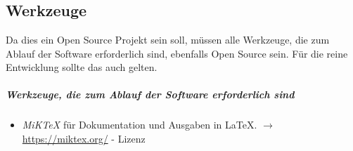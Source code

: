 \documentclass[english,ngerman,parskip=half,headsepline,footsepline]{scrreprt}
\newcounter{Enumi}
\begin{document}
	\appendix
	\chapter{\appendixname} %

	\thispagestyle{scrheadings}

	\section{Werkzeuge} %
	\label{sec:Werkzeuge}

	Da dies ein Open Source Projekt sein soll, müssen alle Werkzeuge, die zum Ablauf der Software erforderlich sind, ebenfalls Open Source sein. Für die reine Entwicklung sollte das auch gelten.

	\paragraph{Werkzeuge, die zum Ablauf der Software erforderlich sind}
	\begin{itemize}

		\item\label{Werkzeug:MiKTeX}\emph{MiK\TeX} für Dokumentation und Ausgaben in \LaTeX. $\rightarrow$ \url{https://miktex.org/} - Lizenz~\cite{bib:MiKTeX}

		\setcounter{Enumi}{\value{enumi}}
	\end{itemize}
\end{document}
